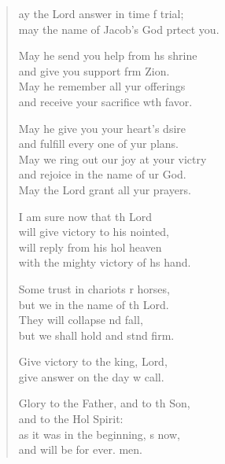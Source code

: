 \begin{verse}
  \begin{patverse}
ay the Lord answer in time f trial;\Med\\
may the name of Jacob’s God prtect you.

May he send you help from h\pointup{\i}s shrine\Med\\
and give you support frm Zion.\\
May he remember all yur offerings\Med\\
and receive your sacrifice w\pointup{\i}th favor.

May he give you your heart’s dsire\Med\\
and fulfill every one of yur plans.\\
May we ring out our joy at your victry\Flex\\
and rejoice in the name of ur God.\Med\\
May the Lord grant all yur prayers.

I am sure now that th Lord\Med\\
will give victory to his nointed,\\
will reply from his hol heaven\Med\\
with the mighty victory of h\pointup{\i}s hand.

Some trust in chariots r horses,\Med\\
but we in the name of th Lord.\\
They will collapse nd fall,\Med\\
but we shall hold and stnd firm.

Give victory to the king,  Lord,\Med\\
give answer on the day w call.

Glory to the Father, and to th Son,\Med\\
and to the Hol Spirit:\\
as it was in the beginning, \pointup{\i}s now,\Med\\
and will be for ever. men.
  \end{patverse}
\end{verse}
